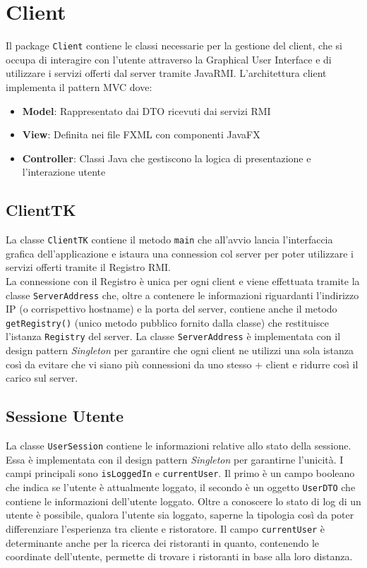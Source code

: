 \section{Client}
Il package \texttt{Client} contiene le classi necessarie per
la gestione del client, che si occupa di interagire con l'utente 
attraverso la Graphical User Interface e di utilizzare i 
servizi offerti dal server tramite JavaRMI.
L'architettura client implementa il pattern MVC dove:
\begin{itemize}
    \item \textbf{Model}: Rappresentato dai DTO ricevuti dai servizi RMI
    \item \textbf{View}: Definita nei file FXML con componenti JavaFX
    \item \textbf{Controller}: Classi Java che gestiscono la logica di presentazione e l'interazione utente
\end{itemize}

\subsection{ClientTK}
La classe \texttt{ClientTK} contiene il metodo \texttt{main}
che all'avvio lancia l'interfaccia grafica dell'applicazione e 
istaura una connession col server per poter utilizzare i servizi 
offerti tramite il Registro RMI.\\
La connessione con il Registro è unica per ogni client e 
viene effettuata tramite la classe \texttt{ServerAddress} che, 
oltre a contenere le informazioni riguardanti l'indirizzo IP (o 
corrispettivo hostname) e la porta del server, contiene anche il metodo
\texttt{getRegistry()} (unico metodo pubblico fornito dalla classe) 
che restituisce l'istanza \texttt{Registry} del server.
La classe \texttt{ServerAddress} è implementata con il design pattern 
\textit{Singleton} per garantire che ogni client ne utilizzi una sola 
istanza così da evitare che vi siano più connessioni da uno stesso +
client e ridurre così il carico sul server.

\subsection{Sessione Utente}
La classe \texttt{UserSession} contiene le informazioni relative
allo stato della sessione.
Essa è implementata con il design pattern \textit{Singleton} 
per garantirne l'unicità.
I campi principali sono \texttt{isLoggedIn} e \texttt{currentUser}.
Il primo è un campo booleano che indica se l'utente è 
attualmente loggato, il secondo è un oggetto \texttt{UserDTO} che 
contiene le informazioni dell'utente loggato.
Oltre a conoscere lo stato di log di un utente è possibile, 
qualora l'utente sia loggato, saperne la tipologia così da 
poter differenziare l'esperienza tra cliente e ristoratore.
Il campo \texttt{currentUser} è determinante anche per la ricerca
dei ristoranti in quanto, contenendo le coordinate dell'utente, 
permette di trovare i ristoranti in base alla loro distanza.

